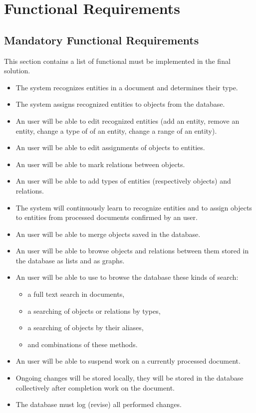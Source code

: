 

\section{Functional Requirements}
\subsection{Mandatory Functional Requirements}
This section contains a list of functional must be implemented in the final solution.

\begin{itemize}
	\item The system recognizes entities in a document and determines their type.
	\item The system assigns recognized entities to objects from the database.
	\item An user will be able to edit recognized entities (add an entity, remove
	an entity, change a type of of an entity, change a range of an entity).
	\item An user will be able to edit assignments of objects to entities.
	\item An user will be able to mark relations between objects.
	\item An user will be able to add types of entities (respectively objects)
	and relations.
	\item The system will continuously learn to recognize entities and to assign
	objects to entities from processed documents confirmed by an user.
	\item An user will be able to merge objects saved in the database.
	\item An user will be able to browse objects and relations between them stored
	in the database as lists and as graphs.
	\item An user will be able to use to browse the database these kinds of search:
	\begin{itemize}
		\item a full text search in documents,
		\item a searching of objects or relations by types,
		\item a searching of objects by their aliases,
		\item and combinations of these methods.
	\end{itemize}
	\item An user will be able to suspend work on a currently processed document.
	\item Ongoing changes will be stored locally, they will be stored in the database
	collectively after completion work on the document.
	\item The database must log (revise) all performed changes.
\end{itemize}

